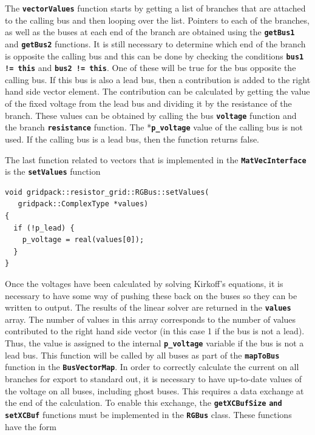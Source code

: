 The \texttt{\textbf{vectorValues}} function starts by getting a list of branches that are attached to the calling bus and then looping over the list. Pointers to each of the branches, as well as the buses at each end of the branch are obtained using the \texttt{\textbf{getBus1}} and \texttt{\textbf{getBus2}} functions. It is still necessary to determine which end of the branch is opposite the calling bus and this can be done by checking the conditions \texttt{\textbf{bus1 != this}} and \texttt{\textbf{bus2 != this}}. One of these will be true for the bus opposite the calling bus. If this bus is also a lead bus, then a contribution is added to the right hand side vector element. The contribution can be calculated by getting the value of the fixed voltage from the lead bus and dividing it by the resistance of the branch. These values can be obtained by calling the bus \texttt{\textbf{voltage}} function and the branch \texttt{\textbf{resistance}} function. The *\texttt{\textbf{p\_voltage}} value of the calling bus is not used. If the calling bus is a lead bus, then the function returns false.

The last function related to vectors that is implemented in the \texttt{\textbf{MatVecInterface}} is the \texttt{\textbf{setValues}} function

{
\color{red}
\begin{Verbatim}[fontseries=b]
void gridpack::resistor_grid::RGBus::setValues(
   gridpack::ComplexType *values)
{
  if (!p_lead) { 
    p_voltage = real(values[0]);
  }
}
\end{Verbatim}
}

Once the voltages have been calculated by solving Kirkoff's equations, it is necessary to have some way of pushing these back on the buses so they can be written to output. The results of the linear solver are returned in the \texttt{\textbf{values}} array. The number of values in this array corresponds to the number of values contributed to the right hand side vector (in this case 1 if the bus is not a lead). Thus, the value is assigned to the internal \texttt{\textbf{p\_voltage}} variable if the bus is not a lead bus. This function will be called by all buses as part of the \texttt{\textbf{mapToBus}} function in the \texttt{\textbf{BusVectorMap}}.
In order to correctly calculate the current on all branches for export to standard out, it is necessary to have up-to-date values of the voltage on all buses, including ghost buses. This requires a data exchange at the end of the calculation. To enable this exchange, the \texttt{\textbf{getXCBufSize}} \texttt{\textbf{and setXCBuf}} functions must be implemented in the \texttt{\textbf{RGBus}} class. These functions have the form

